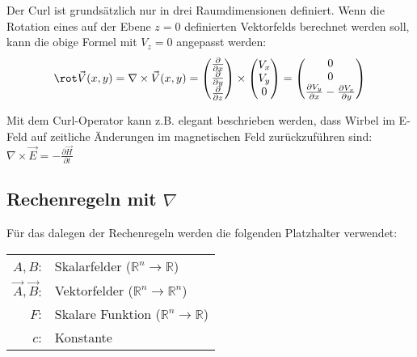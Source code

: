 Der Curl ist grundsätzlich nur in drei Raumdimensionen definiert.
Wenn die Rotation eines auf der Ebene $z=0$ definierten Vektorfelds berechnet werden soll, kann die obige Formel mit $V_z = 0$ angepasst werden:
\[
    \rot \vec{V}(x, y)
    = \nabla \times \vec{V}(x, y)
    =   \begin{pmatrix}
            \frac{\partial}{\partial x}\\
            \frac{\partial}{\partial y}\\
            \frac{\partial}{\partial z}
        \end{pmatrix} \times 
    \begin{pmatrix}
        V_x \\ V_y \\ 0
    \end{pmatrix} =
    \begin{pmatrix}
        0 \\
        0 \\
        \frac{\partial V_y}{\partial x} - \frac{\partial V_x}{\partial y}
    \end{pmatrix}
\]

\begin{outline}
    \1 Mit dem Curl-Operator kann z.B. elegant beschrieben werden, dass Wirbel im E-Feld auf zeitliche Änderungen im magnetischen Feld zurückzuführen sind:
        \2[] $\nabla \times \vec{E} = -\frac{\partial \vec{H}}{\partial t}$
\end{outline}

\subsection[Rechenregeln mit Nabla]{Rechenregeln mit $\nabla$}
Für das dalegen der Rechenregeln werden die folgenden Platzhalter verwendet:
\begin{center}\begin{tabular}[]{r l}
    $A, B$: & Skalarfelder ($\mathbb{R}^n \to \mathbb{R}$) \\
    $\vec{A}, \vec{B}$: & Vektorfelder ($\mathbb{R}^n \to \mathbb{R}^n$) \\
    $F$: & Skalare Funktion ($\mathbb{R}^n \to \mathbb{R}$) \\
    $c$: & Konstante \\
\end{tabular}\end{center}

